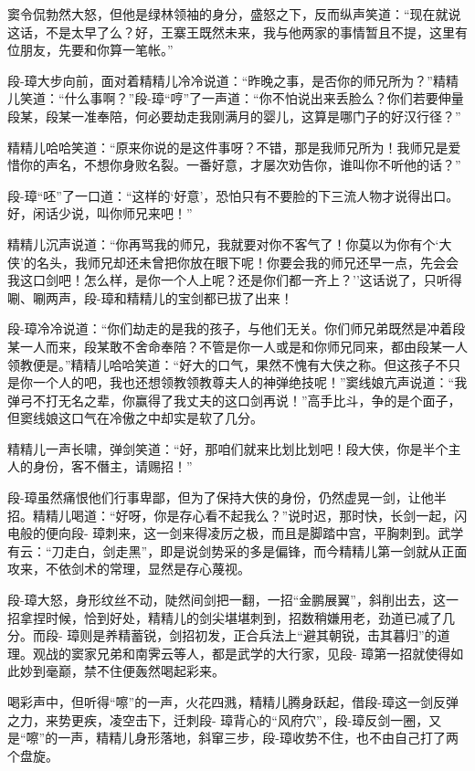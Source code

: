 \documentclass[12pt,oneside]{book}
\begin{document}
窦令侃勃然大怒，但他是绿林领袖的身分，盛怒之下，反而纵声笑道：``现在就说这话，不是太早了么？好，王寨王既然未来，我与他两家的事情暂且不提，这里有位朋友，先要和你算一笔帐。''

段-璋大步向前，面对着精精儿冷冷说道：``昨晚之事，是否你的师兄所为？''精精儿笑道：``什么事啊？''段-璋``哼''了一声道：``你不怕说出来丢脸么？你们若要伸量段某，段某一准奉陪，何必要劫走我刚满月的婴儿，这算是哪门子的好汉行径？''

精精儿哈哈笑道：``原来你说的是这件事呀？不错，那是我师兄所为！我师兄是爱惜你的声名，不想你身败名裂。一番好意，才屡次劝告你，谁叫你不听他的话？''

段-璋``呸''了一口道：``这样的`好意'，恐怕只有不要脸的下三流人物才说得出口。好，闲话少说，叫你师兄来吧！''

精精儿沉声说道：``你再骂我的师兄，我就要对你不客气了！你莫以为你有个`大侠'的名头，我师兄却还未曾把你放在眼下呢！你要会我的师兄还早一点，先会会我这口剑吧！怎么样，是你一个人上呢？还是你们都一齐上？''这话说了，只听得唰、唰两声，段-璋和精精儿的宝剑都已拔了出来！

段-璋冷冷说道：``你们劫走的是我的孩子，与他们无关。你们师兄弟既然是冲着段某一人而来，段某敢不舍命奉陪？不管是你一人或是和你师兄同来，都由段某一人领教便是。''精精儿哈哈笑道：``好大的口气，果然不愧有大侠之称。但这孩子不只是你一个人的吧，我也还想领教领教尊夫人的神弹绝技呢！''窦线娘亢声说道：``我弹弓不打无名之辈，你赢得了我丈夫的这口剑再说！''高手比斗，争的是个面子，但窦线娘这口气在冷傲之中却实是软了几分。

精精儿一声长啸，弹剑笑道：``好，那咱们就来比划比划吧！段大侠，你是半个主人的身份，客不僭主，请赐招！''

段-璋虽然痛恨他们行事卑鄙，但为了保持大侠的身份，仍然虚晃一剑，让他半招。精精儿喝道：``好呀，你是存心看不起我么？''说时迟，那时快，长剑一起，闪电般的便向段-
璋刺来，这一剑来得凌厉之极，而且是脚踏中宫，平胸刺到。武学有云：``刀走白，剑走黑''，即是说剑势采的多是偏锋，而今精精儿第一剑就从正面攻来，不依剑术的常理，显然是存心蔑视。

段-璋大怒，身形纹丝不动，陡然间剑把一翻，一招``金鹏展翼''，斜削出去，这一招拿捏时候，恰到好处，精精儿的剑尖堪堪刺到，招数稍嫌用老，劲道已减了几分。而段-
璋则是养精蓄锐，剑招初发，正合兵法上``避其朝锐，击其暮归''的道理。观战的窦家兄弟和南霁云等人，都是武学的大行家，见段-
璋第一招就使得如此妙到毫巅，禁不住便轰然喝起彩来。

喝彩声中，但听得``嚓''的一声，火花四溅，精精儿腾身跃起，借段-璋这一剑反弹之力，来势更疾，凌空击下，迁刺段-
璋背心的``风府穴''，段-璋反剑一圈，又是``嚓''的一声，精精儿身形落地，斜窜三步，段-璋收势不住，也不由自己打了两个盘旋。
\end{document}
